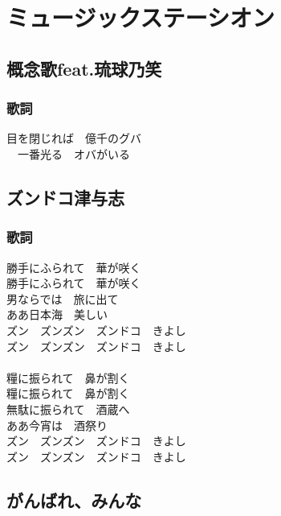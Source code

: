 \chapter{ミュージックステーシオン}
\section{概念歌feat.琉球乃笑}

\subsection{歌詞}

目を閉じれば　億千のグバ\\
　一番光る　オバがいる
\section{ズンドコ津与志}
\subsection{歌詞}
勝手にふられて　華が咲く\\
勝手にふられて　華が咲く\\
男ならでは　旅に出て\\
ああ日本海　美しい\\
ズン　ズンズン　ズンドコ　きよし\\
ズン　ズンズン　ズンドコ　きよし\\
\\
糧に振られて　鼻が割く\\
糧に振られて　鼻が割く\\
無駄に振られて　酒蔵へ\\
ああ今宵は　酒祭り\\
ズン　ズンズン　ズンドコ　きよし\\
ズン　ズンズン　ズンドコ　きよし\\

\newpage
\section{がんばれ、みんな}
